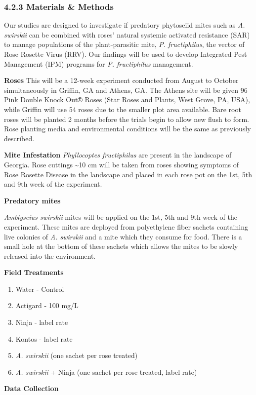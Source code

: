 \documentclass[12pt,final,CPage]{ufthesis}
\begin{document}
{  \hypertarget{materials-methods-4}{%
  \subsubsection{4.2.3 Materials \& Methods}\label{materials-methods-4}}

  Our studies are designed to investigate if predatory phytoseiid mites such as \emph{A. swirskii} can be combined with roses' natural systemic activated resistance (SAR) to manage populations of the plant-parasitic mite, \emph{P. fructiphilus}, the vector of Rose Rosette Virus (RRV). Our findings will be used to develop Integrated Pest Management (IPM) programs for \emph{P. fructiphilus} management.

  \textbf{Roses}
  This will be a 12-week experiment conducted from August to October simultaneously in Griffin, GA and Athens, GA.
  The Athens site will be given 96 Pink Double Knock Out® Roses (Star Roses and Plants, West Grove, PA, USA), while Griffin will use 54 roses due to the smaller plot area available. Bare root roses will be planted 2 months before the trials begin to allow new flush to form. Rose planting media and environmental conditions will be the same as previously described.

  \textbf{Mite Infestation}
  \emph{Phyllocoptes fructiphilus} are present in the landscape of Georgia. Rose cuttings \textasciitilde10 cm will be taken from roses showing symptoms of Rose Rosette Disease in the landscape and placed in each rose pot on the 1st, 5th and 9th week of the experiment.

  \textbf{Predatory mites}

  \emph{Amblyseius swirskii} mites will be applied on the 1st, 5th and 9th week of the experiment. These mites are deployed from polyethylene fiber sachets containing live colonies of \emph{A. swirskii} and a mite which they consume for food. There is a small hole at the bottom of these sachets which allows the mites to be slowly released into the environment.

  \textbf{Field Treatments}
  \begin{enumerate}
  \def\labelenumi{\arabic{enumi}.}
  \tightlist
  \item
    Water - Control
  \item
    Actigard - 100 mg/L
  \item
    Ninja - label rate
  \item
    Kontos - label rate
  \item
    \emph{A. swirskii} (one sachet per rose treated)
  \item
    \emph{A. swirskii} + Ninja (one sachet per rose treated, label rate)
  \end{enumerate}
  \textbf{Data Collection}

}
\end{document}
